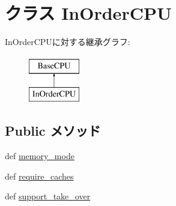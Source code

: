 \hypertarget{classInOrderCPU_1_1InOrderCPU}{
\section{クラス InOrderCPU}
\label{classInOrderCPU_1_1InOrderCPU}
}
InOrderCPUに対する継承グラフ:\begin{figure}[H]
\begin{center}
\leavevmode
\includegraphics[height=2cm]{classInOrderCPU_1_1InOrderCPU}
\end{center}
\end{figure}
\subsection*{Public メソッド}
\begin{DoxyCompactItemize}
\item 
def \hyperlink{classInOrderCPU_1_1InOrderCPU_a53d73a2f804df6a1dcabb22052d09773}{memory\_\-mode}
\item 
def \hyperlink{classInOrderCPU_1_1InOrderCPU_afcb2c5440cbf782e304bdb958eadf744}{require\_\-caches}
\item 
def \hyperlink{classInOrderCPU_1_1InOrderCPU_aa201537acf29724056129b8efad43371}{support\_\-take\_\-over}
\end{DoxyCompactItemize}

